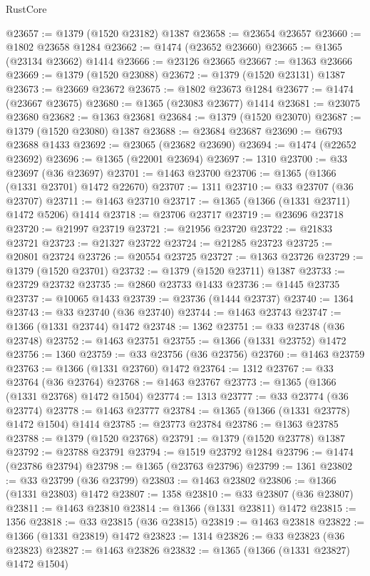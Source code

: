 \begin{lexlean}{RustCore}
\begin{coremodule}
@23657 := @1379 (@1520 @23182) @1387
@23658 := @23654 @23657
@23660 := @1802 @23658 @1284
@23662 := @1474 (@23652 @23660)
@23665 := @1365 (@23134 @23662) @1414
@23666 := @23126 @23665
@23667 := @1363 @23666
@23669 := @1379 (@1520 @23088)
@23672 := @1379 (@1520 @23131) @1387
@23673 := @23669 @23672
@23675 := @1802 @23673 @1284
@23677 := @1474 (@23667 @23675)
@23680 := @1365 (@23083 @23677) @1414
@23681 := @23075 @23680
@23682 := @1363 @23681
@23684 := @1379 (@1520 @23070)
@23687 := @1379 (@1520 @23080) @1387
@23688 := @23684 @23687
@23690 := @6793 @23688 @1433
@23692 := @23065 (@23682 @23690)
@23694 := @1474 (@22652 @23692)
@23696 := @1365 (@22001 @23694)
@23697 := 1310
@23700 := @33 @23697 (@36 @23697)
@23701 := @1463 @23700
@23706 := @1365 (@1366 (@1331 @23701) @1472 @22670)
@23707 := 1311
@23710 := @33 @23707 (@36 @23707)
@23711 := @1463 @23710
@23717 := @1365 (@1366 (@1331 @23711) @1472 @5206) @1414
@23718 := @23706 @23717
@23719 := @23696 @23718
@23720 := @21997 @23719
@23721 := @21956 @23720
@23722 := @21833 @23721
@23723 := @21327 @23722
@23724 := @21285 @23723
@23725 := @20801 @23724
@23726 := @20554 @23725
@23727 := @1363 @23726
@23729 := @1379 (@1520 @23701)
@23732 := @1379 (@1520 @23711) @1387
@23733 := @23729 @23732
@23735 := @2860 @23733 @1433
@23736 := @1445 @23735
@23737 := @10065 @1433
@23739 := @23736 (@1444 @23737)
@23740 := 1364
@23743 := @33 @23740 (@36 @23740)
@23744 := @1463 @23743
@23747 := @1366 (@1331 @23744) @1472
@23748 := 1362
@23751 := @33 @23748 (@36 @23748)
@23752 := @1463 @23751
@23755 := @1366 (@1331 @23752) @1472
@23756 := 1360
@23759 := @33 @23756 (@36 @23756)
@23760 := @1463 @23759
@23763 := @1366 (@1331 @23760) @1472
@23764 := 1312
@23767 := @33 @23764 (@36 @23764)
@23768 := @1463 @23767
@23773 := @1365 (@1366 (@1331 @23768) @1472 @1504)
@23774 := 1313
@23777 := @33 @23774 (@36 @23774)
@23778 := @1463 @23777
@23784 := @1365 (@1366 (@1331 @23778) @1472 @1504) @1414
@23785 := @23773 @23784
@23786 := @1363 @23785
@23788 := @1379 (@1520 @23768)
@23791 := @1379 (@1520 @23778) @1387
@23792 := @23788 @23791
@23794 := @1519 @23792 @1284
@23796 := @1474 (@23786 @23794)
@23798 := @1365 (@23763 @23796)
@23799 := 1361
@23802 := @33 @23799 (@36 @23799)
@23803 := @1463 @23802
@23806 := @1366 (@1331 @23803) @1472
@23807 := 1358
@23810 := @33 @23807 (@36 @23807)
@23811 := @1463 @23810
@23814 := @1366 (@1331 @23811) @1472
@23815 := 1356
@23818 := @33 @23815 (@36 @23815)
@23819 := @1463 @23818
@23822 := @1366 (@1331 @23819) @1472
@23823 := 1314
@23826 := @33 @23823 (@36 @23823)
@23827 := @1463 @23826
@23832 := @1365 (@1366 (@1331 @23827) @1472 @1504)

\end{coremodule}
\end{lexlean}
